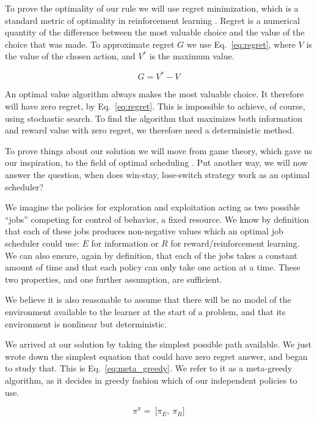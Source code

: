 To prove the optimality of our rule we will use regret minimization, which is a standard metric of optimality in reinforcement learning \citep{Sutton2018}. Regret is a numerical quantity of the difference between the most valuable choice and the value of the choice that was made. To approximate regret $G$ we use Eq.~\ref{eq:regret}, where $V$ is the value of the chosen action, and $V^*$ is the maximum value. 

\begin{equation}
\label{eq:regret}
	G = V^* - V
\end{equation}

An optimal value algorithm always makes the most valuable choice. It therefore will have zero regret, by Eq.~\ref{eq:regret}. This is impossible to achieve, of course, using stochastic search. To find the algorithm that maximizes both information and reward value with zero regret, we therefore need a deterministic method. 

To prove things about our solution we will move from game theory, which gave us our inspiration, to the field of optimal scheduling \citep{Bellmann1954,Roughgarden2019}. Put another way, we will now answer the question, when does win-stay, lose-switch strategy work as an optimal scheduler? 

We imagine the policies for exploration and exploitation acting as two possible ``jobs'' competing for control of behavior, a fixed resource. We know by definition that each of these jobs produces non-negative values which an optimal job scheduler could use: $E$ for information or $R$ for reward/reinforcement learning. We can also ensure, again by definition, that each of the jobs takes a constant amount of time and that each policy can only take one action at a time. These two properties, and one further assumption, are sufficient.

We believe it is also reasonable to assume that there will be no model of the environment available to the learner at the start of a problem, and that its environment is nonlinear but deterministic. 

We arrived at our solution by taking the simplest possible path available. We just wrote down the simplest equation that could have zero regret answer, and began to study that. This is Eq.~\ref{eq:meta_greedy}. We refer to it as a meta-greedy algorithm, as it decides in greedy fashion which of our independent policies to use.

\begin{equation}
\label{eq:pipi} 
\pi^{\pi} = \ \Big [ \pi_E,\ \pi_R \Big ]
\end{equation}

